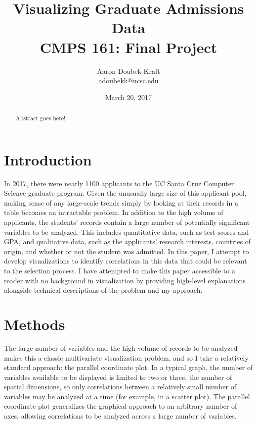 \documentclass[]{article}
\title{Visualizing Graduate Admissions Data \\ CMPS 161: Final Project}
\author{Aaron Doubek-Kraft \\ adoubekk@ucsc.edu}
\date{March 20, 2017}
\begin{document}
	
\begin{titlepage}

	\maketitle

	\begin{abstract}
		Abstract goes here!
	\end{abstract}

\end{titlepage}

\section{Introduction}

	\indent \indent In 2017, there were nearly 1100 applicants to the UC Santa Cruz Computer Science graduate program. Given the unusually large size of this applicant pool, making sense of any large-scale trends simply by looking at their records in a table becomes an intractable problem. In addition to the high volume of applicants, the students' records contain a large number of potentially significant variables to be analyzed. This includes quantitative data, such as test scores and GPA, and qualitative data, such as the applicants' research interests, countries of origin, and whether or not the student was admitted.  In this paper, I attempt to develop visualizations to identify correlations in this data that could be relevant to the selection process. I have attempted to make this paper accessible to a reader with no background in visualization by providing high-level explanations alongside technical descriptions of the problem and my approach.

\section{Methods}

	\indent \indent The large number of variables and the high volume of records to be analyzed makes this a classic multivariate visualization problem, and so I take a relatively standard approach: the parallel coordinate plot. In a typical graph, the number of variables available to be displayed is limited to two or three, the number of spatial dimensions, so only correlations between a relatively small number of variables may be analyzed at a time (for example, in a scatter plot). The parallel coordinate plot generalizes the graphical approach to an arbitrary number of axes, allowing correlations to be analyzed across a large number of variables.
\end{document}
